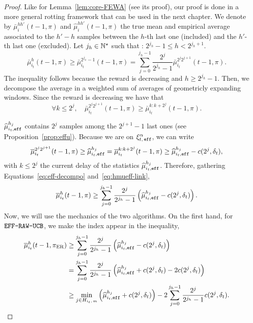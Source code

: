 \begin{proof}
Like for Lemma~\ref{lem:core-FEWA} (see its proof), our proof is done in a more general rotting framework that can be used in the next chapter. We denote by $\bar{\mu}^{hh'}_i(t-1,\pi)$ and $\hat{\mu}^{hh'}_i(t-1,\pi)$ the true mean and empirical average associated to the $h'-h$ samples between the $h$-th last one (included) and the $h'$-th last one (excluded). Let $j_h \in {\mathbb N}^\star$ such that :
$2^{j_h} -1 \leq  h < 2^{j_h+1}$.
\begin{equation}
\label{eq:eff-decompo}
\bar{\mu}^{h}_{i_t}(t-1,\pi) \geq \bar{\mu}^{2^{j_h}-1}_{i_t}(t-1,\pi) = \sum_{j=0}^{j_h-1} \frac{2^j}{2^{j_h}-1} \bar{\mu}^{2^{j}2^{j+1}}_{i_t}(t-1,\pi).
\end{equation}
The inequality follows because the reward is decreasing and $h\geq 2^{j_h}-1$. Then, we decompose the average in a weighted sum of averages of geometricly expanding windows. Since the reward is decreasing we have that 
\begin{equation*}
\forall k \leq 2^j, \quad \bar{\mu}^{2^{j}2^{j+1}}_{i_t}(t-1,\pi) \geq \bar{\mu}^{k : k+2^{j}}_{i_t}(t-1,\pi).
\end{equation*}

$\widehat{\mu}_{i_t,\texttt{eff}}^{h_j}$ contains $2^j$ samples among the $2^{j+1}-1$ last ones (see Proposition~\ref{prop:effu}). Because we are on $\xi^\alpha_{t,\, \texttt{eff}}$,  we can write
\begin{equation}
\label{eq:hmueff-link}
\overline{\mu}^{2^{j}2^{j+1}}_{i_t}(t-1,\pi) \geq \widehat{\mu}_{i_t,\texttt{eff}}^{h_j} = \overline{\mu}^{k : k+2^{j}}_{i_t}(t-1,\pi)\geq  \widehat{\mu}_{i_t,\texttt{eff}}^{h_j} - c(2^j, \delta_t),
\end{equation}
with $k\leq 2^j$ the current delay of the statistics $\widehat{\mu}_{i_t,\texttt{eff}}^{h_j}$. Therefore, gathering Equations~\ref{eq:eff-decompo} and~\ref{eq:hmueff-link}, 
\begin{equation}
\label{eq:eff-general}
\overline{\mu}^{h}_{i_t}(t-1,\pi) \geq \sum_{j=0}^{j_h-1} \frac{2^j}{2^{j_h}-1} \left(\widehat{\mu}_{i_t,\texttt{eff}}^{h_j} - c(2^j, \delta_t)\right).
\end{equation}
Now, we will use the mechanics of the two algorithms. On the first hand, for $\normalfont \texttt{EFF-RAW-UCB}$, we make the index appear in the inequality,
\begin{align}
 \overline{\mu}^{h}_{i_t}(t-1,\normalfont \pi_{\rm ER}) &\geq \sum_{j=0}^{j_h-1} \frac{2^j}{2^{j_h}-1} \left(\widehat{\mu}_{i_t,\texttt{eff}}^{h_j} - c(2^j, \delta_t)\right) \nonumber\\
 &=\sum_{j=0}^{j_h-1} \frac{2^j}{2^{j_h}-1} \left(\widehat{\mu}_{i_t,\texttt{eff}}^{h_j} + c(2^j, \delta_t) - 2c(2^j, \delta_t)\right)\nonumber\\
 &\geq \min_{j \in H_{i_t,\,m}} \left(\widehat{\mu}_{i_t,\texttt{eff}}^{h_j} + c(2^j, \delta_t)\right) - 2 \sum_{j=0}^{j_h-1} \frac{2^{j}}{2^{j_h}-1} c(2^j, \delta_t).
 \label{eq:effraw-index-appear}
 \end{align}
 

\end{proof}
